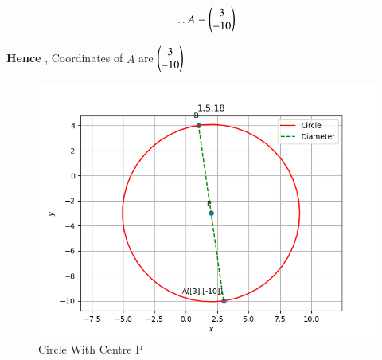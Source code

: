 \documentclass[journal]{IEEEtran}
\numberwithin{equation}{enumi}
\numberwithin{figure}{enumi}
\begin{document}
\begin{align*}
        \therefore A \equiv \begin{pmatrix}3\\-10\end{pmatrix}
\end{align*}

\textbf{Hence} , Coordinates of $A$ are $\begin{pmatrix}3\\-10\end{pmatrix}$ 

\begin{figure}[H]
    \centering
    \includegraphics[width=1\linewidth]{figs/circle_graph2.png}
    \caption{Circle With Centre P}
    \label{fig:placeholder_1}
\end{figure}
\end{document}
